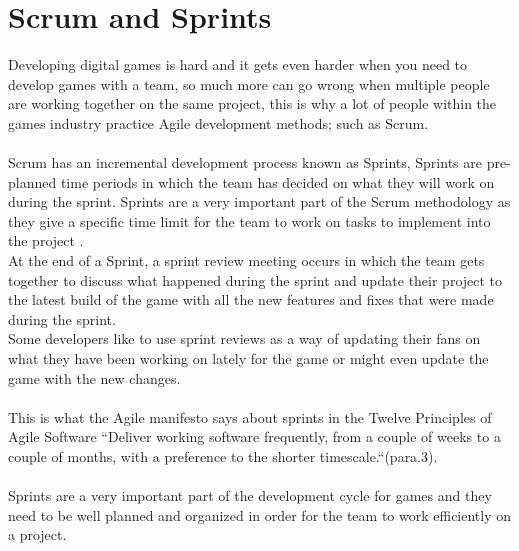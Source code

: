 \documentclass{scrartcl}
\begin{document}
\section{Scrum and Sprints}
Developing digital games is hard and it gets even harder when you need to develop games with a team, so much more can go wrong when multiple people are working together on the same project, this is why a lot of people within the games industry practice Agile development methods; such as Scrum.
\\~\\
Scrum has an incremental development process known as Sprints, Sprints are pre-planned time periods in which the team has decided on what they will work on during the sprint. Sprints are a very important part of the Scrum methodology as they give a specific time limit for the team to work on tasks to implement into the project \cite{five} \cite{eight}.\\
At the end of a Sprint, a sprint review meeting occurs in which the team gets together to discuss what happened during the sprint and update their project to the latest build of the game with all the new features and fixes that were made during the sprint\cite{eight}.\\
Some developers like to use sprint reviews as a way of updating their fans on what they have been working on lately for the game or might even update the game with the new changes.
\\~\\
This is what the Agile manifesto says about sprints in the Twelve Principles of Agile Software ``Deliver working software frequently, from a couple of weeks to a couple of months, with a preference to the shorter timescale.``(para.3)\cite{three}.
\\~\\
Sprints are a very important part of the development cycle for games and they need to be well planned and organized in order for the team to work efficiently on a project.
\end{document}

